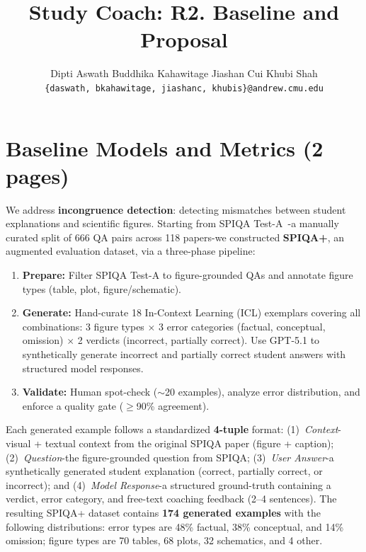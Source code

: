 \documentclass{article} %
\title{Study Coach: R2. Baseline and Proposal}
\author{
  Dipti Aswath \hspace{2em} Buddhika Kahawitage \hspace{2em} Jiashan Cui \hspace{2em} Khubi Shah \\
  \texttt{\{daswath, bkahawitage, jiashanc, khubis\}@andrew.cmu.edu}
  }
\date{}
\begin{document}
\maketitle


\section{Baseline Models and Metrics (2 pages)}

We address \textbf{incongruence detection}: detecting mismatches between student explanations and scientific figures. Starting from SPIQA Test-A~\cite{pramanick2024spiqa}-a manually curated split of 666 QA pairs across 118 papers-we constructed \textbf{SPIQA+}, an augmented evaluation dataset, via a three-phase pipeline:
\begin{enumerate}[itemsep=6pt]
    \item \textbf{Prepare:} Filter SPIQA Test-A to figure-grounded QAs and annotate figure types (table, plot, figure/schematic).

    \item \textbf{Generate:} Hand-curate 18 In-Context Learning (ICL) exemplars covering all combinations: 3 figure types $\times$ 3 error categories (factual, conceptual, omission) $\times$ 2 verdicts (incorrect, partially correct). Use GPT-5.1 to synthetically generate incorrect and partially correct student answers with structured model responses.

    \item \textbf{Validate:} Human spot-check (${\sim}$20 examples), analyze error distribution, and enforce a quality gate ($\geq$90\% agreement).
\end{enumerate}
Each generated example follows a standardized \textbf{4-tuple} format: (1)~\textit{Context}-visual + textual context from the original SPIQA paper (figure + caption); (2)~\textit{Question}-the figure-grounded question from SPIQA; (3)~\textit{User Answer}-a synthetically generated student explanation (correct, partially correct, or incorrect); and (4)~\textit{Model Response}-a structured ground-truth containing a verdict, error category, and free-text coaching feedback (2--4 sentences). The resulting SPIQA+ dataset contains \textbf{174 generated examples} with the following distributions: error types are 48\% factual, 38\% conceptual, and 14\% omission; figure types are 70 tables, 68 plots, 32 schematics, and 4 other.
\end{document}
